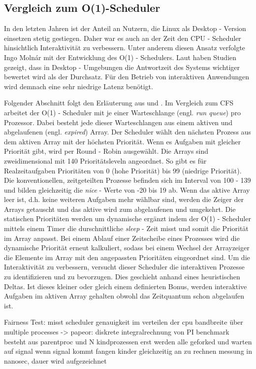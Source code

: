 \subsection{Vergleich zum O(1)-Scheduler}\label{s:compO1}
In den letzten Jahren ist der Anteil an Nutzern, die Linux als Desktop - Version einsetzen stetig gestiegen. Daher war es auch an der Zeit den CPU - Scheduler hinsichtlich Interaktivität zu verbessern. Unter anderem diesen Ansatz verfolgte Ingo Molnár mit der Entwicklung des O(1) - Schedulers. Laut \cite{papercomparison} haben Studien gezeigt, dass in Desktop - Umgebungen die Antwortzeit des Systems wichtiger bewertet wird als der Durchsatz. Für den Betrieb von interaktiven Anwendungen wird demnach eine sehr niedrige Latenz benötigt. 

Folgender Abschnitt folgt den Erläuterung aus \cite{asilberschatz} und \cite{papercomparison}.
Im Vergleich zum CFS arbeitet der O(1) - Scheduler mit je einer Warteschlange (engl. \textit{run queue}) pro Prozessor. Dabei besteht jede dieser Warteschlangen aus einem aktiven und abgelaufenen (engl. \textit{expired}) Array. Der Scheduler wählt den nächsten Prozess aus dem aktiven Array mit der höchsten Priorität. Wenn es Aufgaben mit gleicher Priorität gibt, wird per Round - Robin ausgewählt. Die Arrays sind zweidimensional mit 140 Prioritätsleveln angeordnet. So gibt es für Realzeitaufgaben Prioritäten von 0 (hohe Priorität) bis 99 (niedrige Priorität). Die konventionellen, zeitgeteilten Prozesse befinden sich im Interval von 100 - 139 und bilden gleichzeitig die \textit{nice} - Werte von -20 bis 19 ab. Wenn das aktive Array leer ist, d.h. keine weiteren Aufgaben mehr wählbar sind, werden die Zeiger der Arrays getauscht und das aktive wird zum abgelaufenen und umgekehrt. Die statischen Prioritäten werden um dynamische ergänzt indem der O(1) - Scheduler mittels einem Timer die durschnittliche \textit{sleep} - Zeit misst und somit die Priorität im Array anpasst. Bei einem Ablauf einer Zeitscheibe eines Prozesses wird die dynamische Priorität erneut kalkuliert, sodass bei einem Wechsel der Arrayzeiger die Elemente im Array mit den angepassten Prioritäten eingeordnet sind. Um die Interaktivität zu verbessern, versucht dieser Scheduler die interaktiven Prozesse zu identifizieren und zu bevorzugen. Dies geschieht anhand eines heuristischen Deltas. Ist dieses kleiner oder gleich einem definierten Bonus, werden interaktive Aufgaben im aktiven Array gehalten obwohl das Zeitquantum schon abgelaufen ist.

Fairness Test:
misst scheduler genauigkeit im verteilen der cpu bandbreite über multiple processes
-> papeor: diskrete integralrechnung von PI 
benchmark besteht aus parentproc und N kindprozessen
	erst werden alle geforked und warten auf signal
	wenn signal kommt fangen kinder gleichzeitig an zu rechnen
	messung in nanosec, dauer wird aufgezeichnet
	
